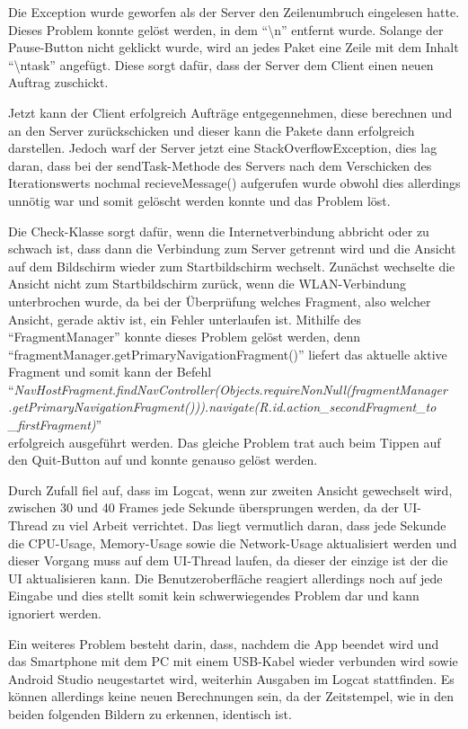 \documentclass[12pt, onecolumn, notitlepage]{scrartcl}
\begin{document}
Die Exception wurde geworfen als der Server den Zeilenumbruch eingelesen hatte. Dieses Problem konnte gelöst werden, in dem \enquote{\textbackslash n} entfernt wurde. Solange der Pause-Button nicht geklickt wurde, wird an jedes Paket eine Zeile mit dem Inhalt \enquote{\textbackslash ntask} angefügt. Diese sorgt dafür, dass der Server dem Client einen neuen Auftrag zuschickt. \par
Jetzt kann der Client erfolgreich Aufträge entgegennehmen, diese berechnen und an den Server zurückschicken und dieser kann die Pakete dann erfolgreich darstellen. Jedoch warf der Server jetzt eine StackOverflowException, dies lag daran, dass bei der sendTask-Methode des Servers nach dem Verschicken des Iterationswerts nochmal recieveMessage() aufgerufen wurde obwohl dies allerdings unnötig war und somit gelöscht werden konnte und das Problem löst. \par
Die Check-Klasse sorgt dafür, wenn die Internetverbindung abbricht oder zu schwach ist, dass dann die Verbindung zum Server getrennt wird und die Ansicht auf dem Bildschirm wieder zum Startbildschirm wechselt. Zunächst wechselte die Ansicht nicht zum Startbildschirm zurück, wenn die WLAN-Verbindung unterbrochen wurde, da bei der Überprüfung welches Fragment, also welcher Ansicht, gerade aktiv ist, ein Fehler unterlaufen ist. Mithilfe des \enquote{FragmentManager} konnte dieses Problem gelöst werden, denn \enquote{fragmentManager.getPrimaryNavigationFragment()} liefert das aktuelle aktive Fragment und somit kann der Befehl \\
\enquote{\textit{NavHostFragment.findNavController(Objects.requireNonNull(fragmentManager\\.getPrimaryNavigationFragment())).navigate(R.id.action\_secondFragment\_to\\\_firstFragment)}} \\
erfolgreich ausgeführt werden. Das gleiche Problem trat auch beim Tippen auf den Quit-Button auf und konnte genauso gelöst werden. \par
Durch Zufall fiel auf, dass im Logcat, wenn zur zweiten Ansicht gewechselt wird, zwischen 30 und 40 Frames jede Sekunde übersprungen werden, da der UI-Thread zu viel Arbeit verrichtet. Das liegt vermutlich daran, dass jede Sekunde die CPU-Usage, Memory-Usage sowie die Network-Usage aktualisiert werden und dieser Vorgang muss auf dem UI-Thread laufen, da dieser der einzige ist der die UI aktualisieren kann. Die Benutzeroberfläche reagiert allerdings noch auf jede Eingabe und dies stellt somit kein schwerwiegendes Problem dar und kann ignoriert werden. \par
Ein weiteres Problem besteht darin, dass, nachdem die App beendet wird und das Smartphone mit dem PC mit einem USB-Kabel wieder verbunden wird sowie Android Studio neugestartet wird, weiterhin Ausgaben im Logcat stattfinden. Es können allerdings keine neuen Berechnungen sein, da der Zeitstempel, wie in den beiden folgenden Bildern zu erkennen, identisch ist.
\end{document}
